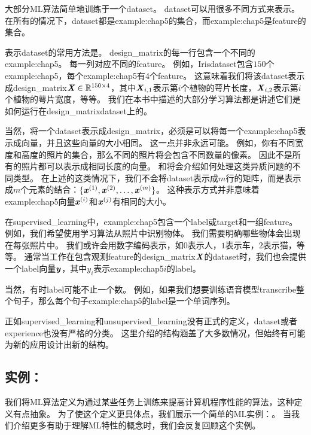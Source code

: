 大部分\gls{ML}算法简单地训练于一个\gls{dataset}。
\gls{dataset}可以用很多不同方式来表示。
在所有的情况下，\gls{dataset}都是\gls{example:chap5}的集合，而\gls{example:chap5}是\gls{feature}的集合。

表示\gls{dataset}的常用方法是。
\gls{design_matrix}的每一行包含一个不同的\gls{example:chap5}。
每一列对应不同的\gls{feature}。
例如，Iris\gls{dataset}包含$150$个\gls{example:chap5}，每个\gls{example:chap5}有4个\gls{feature}。
这意味着我们将该\gls{dataset}表示成\gls{design_matrix}$\boldsymbol{\mathit{X}}\in\mathbb{R}^{150\times 4}$，其中$\boldsymbol{\mathit{X}}_{i,1}$表示第$i$个植物的萼片长度，$\boldsymbol{\mathit{X}}_{i,2}$表示第$i$个植物的萼片宽度，等等。
我们在本书中描述的大部分学习算法都是讲述它们是如何运行在\gls{design_matrix}\gls{dataset}上的。

当然，将一个\gls{dataset}表示成\gls{design_matrix}，必须是可以将每一个\gls{example:chap5}表示成向量，并且这些向量的大小相同。
这一点并非永远可能。
例如，你有不同宽度和高度的照片的集合，那么不同的照片将会包含不同数量的像素。
因此不是所有的照片都可以表示成相同长度的向量。
和将会介绍如何处理这类异质问题的不同类型。
在上述的这类情况下，我们不会将\gls{dataset}表示成$m$行的矩阵，而是表示成$m$个元素的结合：$\{\boldsymbol{\mathit{x}}^{(1)},\boldsymbol{\mathit{x}}^{(2)},\dots,\boldsymbol{\mathit{x}}^{(m)}\}$。
这种表示方式并非意味着\gls{example:chap5}向量$\boldsymbol{\mathit{x}}^{(i)}$和$\boldsymbol{\mathit{x}}^{(j)}$有相同的大小。


在\gls{supervised_learning}中，\gls{example:chap5}包含一个\gls{label}或\gls{target}和一组\gls{feature}。
例如，我们希望使用学习算法从照片中识别物体。
我们需要明确哪些物体会出现在每张照片中。
我们或许会用数字编码表示，如$0$表示人，$1$表示车，$2$表示猫，等等。
通常当工作在包含观测\gls{feature}的\gls{design_matrix}$\boldsymbol{\mathit{X}}$的\gls{dataset}时，我们也会提供一个\gls{label}向量$\boldsymbol{\mathit{y}}$，其中$y_i$表示\gls{example:chap5}$i$的\gls{label}。

当然，有时\gls{label}可能不止一个数。
例如，如果我们想要训练语音模型\gls{transcribe}整个句子，那么每个句子\gls{example:chap5}的\gls{label}是一个单词序列。

正如\gls{supervised_learning}和\gls{unsupervised_learning}没有正式的定义，\gls{dataset}或者\gls{experience}也没有严格的分类。
这里介绍的结构涵盖了大多数情况，但始终有可能为新的应用设计出新的结构。

\subsection{实例：}
\label{sec:example_linear_regression}
我们将\gls{ML}算法定义为通过某些任务上训练来提高计算机程序性能的算法，这种定义有点抽象。
为了使这个定义更具体点，我们展示一个简单的\gls{ML}实例：。
当我们介绍更多有助于理解\gls{ML}特性的概念时，我们会反复回顾这个实例。


